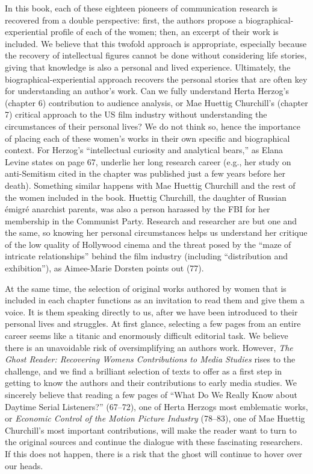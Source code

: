 \documentclass{tufte-handout}
\begin{document}
In this book, each of these eighteen pioneers of communication research
is recovered from a double perspective: first, the authors propose a
biographical-experiential profile of each of the women; then, an excerpt
of their work is included. We believe that this twofold approach is
appropriate, especially because the recovery of intellectual figures
cannot be done without considering life stories, giving that knowledge
is also a personal and lived experience. Ultimately, the
biographical-experiential approach recovers the personal stories that
are often key for understanding an author's work. Can we fully
understand Herta Herzog's (chapter 6) contribution to audience analysis,
or Mae Huettig Churchill's (chapter 7) critical approach to the US film
industry without understanding the circumstances of their personal
lives? We do not think so, hence the importance of placing each of these
women's works in their own specific and biographical context. For
Herzog's ``intellectual curiosity and analytical bears,'' as Elana
Levine states on page 67, underlie her long research career (e.g., her
study on anti-Semitism cited in the chapter was published just a few
years before her death). Something similar happens with Mae Huettig
Churchill and the rest of the women included in the book. Huettig
Churchill, the daughter of Russian émigré anarchist parents, was also a
person harassed by the FBI for her membership in the Communist Party.
Research and researcher are but one and the same, so knowing her
personal circumstances helps us understand her critique of the low
quality of Hollywood cinema and the threat posed by the ``maze of
intricate relationships'' behind the film industry (including
``distribution and exhibition''), as Aimee-Marie Dorsten points out
(77).

At the same time, the selection of original works authored by women that
is included in each chapter functions as an invitation to read them and
give them a voice. It is them speaking directly to us, after we have
been introduced to their personal lives and struggles. At first glance,
selecting a few pages from an entire career seems like a titanic and
enormously difficult editorial task. We believe there is an unavoidable
risk of oversimplifying an author\textquotesingle s work. However,
\emph{The Ghost Reader: Recovering Women\textquotesingle s Contributions
to Media Studies} rises to the challenge, and we find a brilliant
selection of texts to offer as a first step in getting to know the
authors and their contributions to early media studies. We sincerely
believe that reading a few pages of ``What Do We Really Know about
Daytime Serial Listeners?'' (67--72), one of Herta
Herzog\textquotesingle s most emblematic works, or \emph{Economic
Control of the Motion Picture Industry} (78--83), one of Mae Huettig
Churchill's most important contributions, will make the reader want to
turn to the original sources and continue the dialogue with these
fascinating researchers. If this does not happen, there is a risk that
the ghost will continue to hover over our heads.
\end{document}
